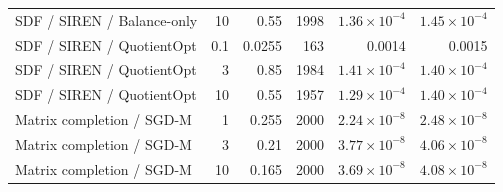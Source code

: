 \begin{longtable}{@{}lrrrrr@{}}
SDF / SIREN / Balance-only & 10 & 0.55 & 1998 & $1.36\!\times\!10^{-4}$ & $1.45\!\times\!10^{-4}$\\
\rowcolor{oursbg}SDF / SIREN / QuotientOpt & 0.1 & 0.0255 & 163 & 0.0014 & 0.0015\\
\rowcolor{oursbg}SDF / SIREN / QuotientOpt & 3 & 0.85 & 1984 & $1.41\!\times\!10^{-4}$ & $1.40\!\times\!10^{-4}$\\
\rowcolor{oursbg}SDF / SIREN / QuotientOpt & 10 & 0.55 & 1957 & $1.29\!\times\!10^{-4}$ & $1.40\!\times\!10^{-4}$\\
Matrix completion / SGD-M & 1 & 0.255 & 2000 & $2.24\!\times\!10^{-8}$ & $2.48\!\times\!10^{-8}$\\
Matrix completion / SGD-M & 3 & 0.21 & 2000 & $3.77\!\times\!10^{-8}$ & $4.06\!\times\!10^{-8}$\\
Matrix completion / SGD-M & 10 & 0.165 & 2000 & $3.69\!\times\!10^{-8}$ & $4.08\!\times\!10^{-8}$\\
\bottomrule
\end{longtable}
\endgroup
